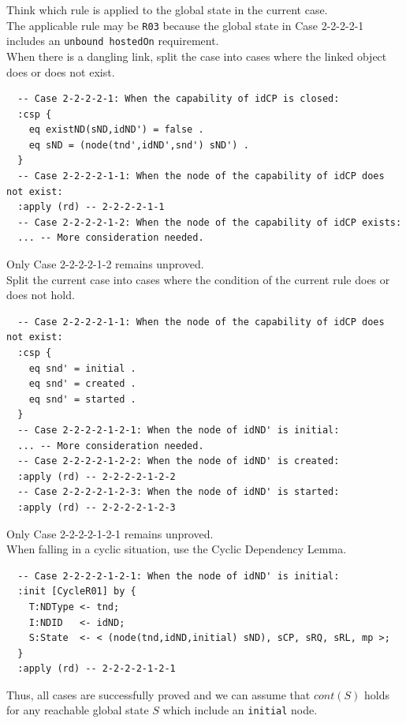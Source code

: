 \documentclass[12pt]{report}
\begin{document}
 Think which rule is applied to the 
global state in the current case. \\
The applicable rule may be {\tt R03} because the global state in Case
2-2-2-2-1 includes an {\tt unbound hostedOn} requirement.\\

 When there is a dangling link, split the case
into cases where the linked object does or does not exist.
\small
\begin{verbatim}
  -- Case 2-2-2-2-1: When the capability of idCP is closed:
  :csp {
    eq existND(sND,idND') = false .
    eq sND = (node(tnd',idND',snd') sND') .
  }
  -- Case 2-2-2-2-1-1: When the node of the capability of idCP does not exist:
  :apply (rd) -- 2-2-2-2-1-1
  -- Case 2-2-2-2-1-2: When the node of the capability of idCP exists:
  ... -- More consideration needed.
\end{verbatim}
\normalsize
Only Case 2-2-2-2-1-2 remains unproved.\\

 Split the current case into cases where
the condition of the current rule does or does not hold.
\small
\begin{verbatim}
  -- Case 2-2-2-2-1-1: When the node of the capability of idCP does not exist:
  :csp {
    eq snd' = initial .
    eq snd' = created .
    eq snd' = started .
  }
  -- Case 2-2-2-2-1-2-1: When the node of idND' is initial:
  ... -- More consideration needed.
  -- Case 2-2-2-2-1-2-2: When the node of idND' is created:
  :apply (rd) -- 2-2-2-2-1-2-2
  -- Case 2-2-2-2-1-2-3: When the node of idND' is started:
  :apply (rd) -- 2-2-2-2-1-2-3
\end{verbatim}
\normalsize
Only Case 2-2-2-2-1-2-1 remains unproved.\\

 When falling in a cyclic situation, use the
Cyclic Dependency Lemma. 
\small
\begin{verbatim}
  -- Case 2-2-2-2-1-2-1: When the node of idND' is initial:
  :init [CycleR01] by {
    T:NDType <- tnd;
    I:NDID   <- idND;
    S:State  <- < (node(tnd,idND,initial) sND), sCP, sRQ, sRL, mp >;
  }
  :apply (rd) -- 2-2-2-2-1-2-1
\end{verbatim}
\normalsize
Thus, all cases are successfully proved and we can assume that $cont(S)$
holds for any reachable global state $S$ which include an {\tt initial} node.
\end{document}

